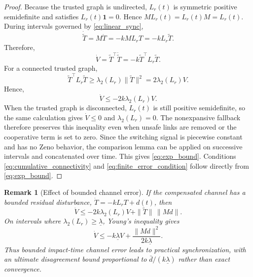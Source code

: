 \documentclass[lettersize,journal]{IEEEtran}
\newtheorem{remark}{Remark}
\begin{document}
\begin{proof}
Because the trusted graph is undirected, $L_r(t)$ is symmetric positive semidefinite and satisfies $L_r(t)\mathbf{1}=0$. Hence $ML_r(t)=L_r(t)M=L_r(t)$. During intervals governed by \eqref{eq:linear_sync},
\begin{equation}
    \dot{\tilde T}
    =
    M\dot T
    =
    -kML_rT
    =
    -kL_r\tilde T .
\end{equation}
Therefore,
\begin{equation}
    \dot V
    =
    \tilde T^\top\dot{\tilde T}
    =
    -k\tilde T^\top L_r\tilde T .
\end{equation}
For a connected trusted graph,
\begin{equation}
    \tilde T^\top L_r\tilde T
    \ge
    \lambda_2(L_r)\|\tilde T\|^2
    =
    2\lambda_2(L_r)V.
\end{equation}
Hence,
\begin{equation}
    \dot V
    \le
    -2k\lambda_2(L_r)V.
\end{equation}
When the trusted graph is disconnected, $L_r(t)$ is still positive semidefinite, so the same calculation gives $\dot V\le0$ and $\lambda_2(L_r)=0$. The nonexpansive fallback therefore preserves this inequality even when unsafe links are removed or the cooperative term is set to zero. Since the switching signal is piecewise constant and has no Zeno behavior, the comparison lemma can be applied on successive intervals and concatenated over time. This gives \eqref{eq:exp_bound}. Conditions \eqref{eq:cumulative_connectivity} and \eqref{eq:finite_error_condition} follow directly from \eqref{eq:exp_bound}.
\end{proof}

\begin{remark}[Effect of bounded channel error]
If the compensated channel has a bounded residual disturbance, $\dot T=-kL_rT+d(t)$, then
\begin{equation}
    \dot V
    \le
    -2k\lambda_2(L_r)V
    +
    \|\tilde T\|\,\|Md\|.
\end{equation}
On intervals where $\lambda_2(L_r)\ge\underline\lambda$, Young's inequality gives
\begin{equation}
    \dot V
    \le
    -k\underline\lambda V
    +
    \frac{\|Md\|^2}{2k\underline\lambda}.
\end{equation}
Thus bounded impact-time channel error leads to practical synchronization, with an ultimate disagreement bound proportional to $\bar d/(k\underline\lambda)$ rather than exact convergence.
\end{remark}
\end{document}
